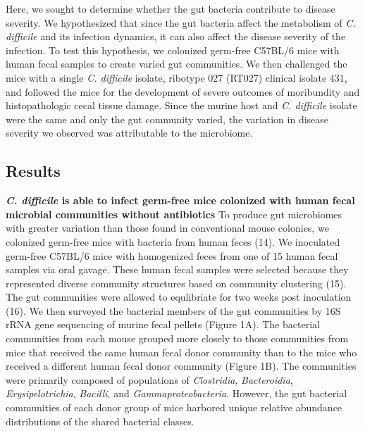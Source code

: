 \documentclass[
  12pt,
]{article}
\begin{document}
Here, we sought to determine whether the gut bacteria contribute to
disease severity. We hypothesized that since the gut bacteria affect the
metabolism of \emph{C. difficile} and its infection dynamics, it can
also affect the disease severity of the infection. To test this
hypothesis, we colonized germ-free C57BL/6 mice with human fecal samples
to create varied gut communities. We then challenged the mice with a
single \emph{C. difficile} isolate, ribotype 027 (RT027) clinical
isolate 431, and followed the mice for the development of severe
outcomes of moribundity and histopathologic cecal tissue damage. Since
the murine host and \emph{C. difficile} isolate were the same and only
the gut community varied, the variation in disease severity we observed
was attributable to the microbiome.

\hypertarget{results}{%
\subsection{Results}\label{results}}

\textbf{\emph{C. difficile} is able to infect germ-free mice colonized
with human fecal microbial communities without antibiotics} To produce
gut microbiomes with greater variation than those found in conventional
mouse colonies, we colonized germ-free mice with bacteria from human
feces (14). We inoculated germ-free C57BL/6 mice with homogenized feces
from one of 15 human fecal samples via oral gavage. These human fecal
samples were selected because they represented diverse community
structures based on community clustering (15). The gut communities were
allowed to equlibriate for two weeks post inoculation (16). We then
surveyed the bacterial members of the gut communities by 16S rRNA gene
sequencing of murine fecal pellets (Figure 1A). The bacterial
communities from each mouse grouped more closely to those communities
from mice that received the same human fecal donor community than to the
mice who received a different human fecal donor community (Figure 1B).
The communities were primarily composed of populations of
\emph{Clostridia}, \emph{Bacteroidia}, \emph{Erysipelotrichia},
\emph{Bacilli}, and \emph{Gammaproteobacteria}. However, the gut
bacterial communities of each donor group of mice harbored unique
relative abundance distributions of the shared bacterial classes.
\end{document}
